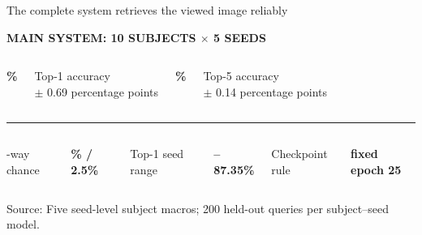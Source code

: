 \documentclass[aspectratio=169]{beamer}
\newcommand{\sourcefooter}[1]{%
  \vfill
  {\color{MidGray}\fontsize{6.7}{8.0}\selectfont Source: #1\par}
}
\newcommand{\metric}[3]{%
  {\color{#1}\bfseries\fontsize{31}{34}\selectfont #2\par}
  \vspace{2pt}
  {\fontsize{13}{16}\selectfont #3\par}
}
\newcommand{\smalllabel}[2]{%
  {\color{#1}\bfseries\fontsize{9.5}{11.5}\selectfont\MakeUppercase{#2}\par}
}
\begin{document}
\begin{frame}{The complete system retrieves the viewed image reliably}
  \smalllabel{BrainBlue}{Main system: 10 subjects $\times$ 5 seeds}
  \vspace{12pt}
  \begin{columns}[T,onlytextwidth]
      \centering
      \metric{BrainBlue}{86.66\%}{Top-1 accuracy\\
        {\color{MidGray}$\pm$ 0.69 percentage points}}

      \centering
      \metric{VisionGreen}{98.38\%}{Top-5 accuracy\\
        {\color{MidGray}$\pm$ 0.14 percentage points}}
  \end{columns}

  \vspace{14pt}
  {\color{HAIred}\rule{\textwidth}{1.5pt}}
  \vspace{6pt}
  \begin{columns}[T,onlytextwidth]
      \centering
      {\color{MidGray}\fontsize{10}{12}-way chance\par}
      {\bfseries\fontsize{15}{18}\% / 2.5\%\par}
      \centering
      {\color{MidGray}\fontsize{10}{12}\selectfont Top-1 seed range\par}
      {\bfseries\fontsize{15}{18}--87.35\%\par}
      \centering
      {\color{MidGray}\fontsize{10}{12}\selectfont Checkpoint rule\par}
      {\bfseries\fontsize{15}{18}\selectfont fixed epoch 25\par}
  \end{columns}
  \sourcefooter{Five seed-level subject macros; 200 held-out queries per subject--seed model.}
\end{frame}
\end{document}
